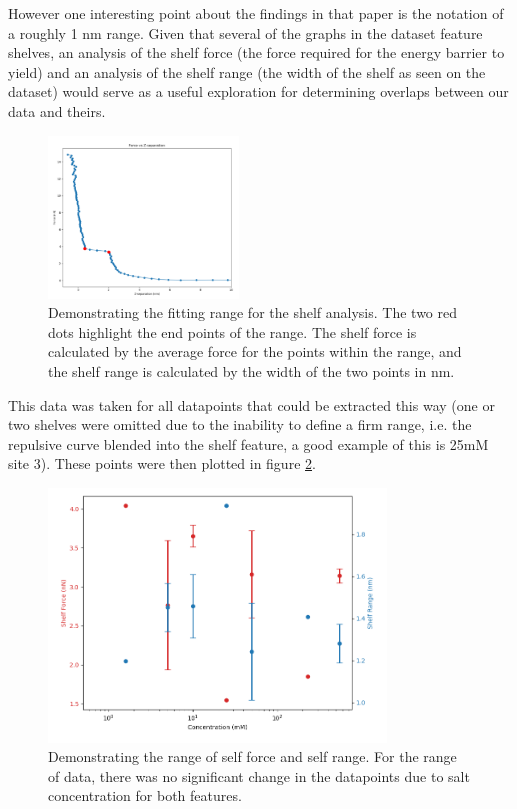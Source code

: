 However one interesting point about the findings in that paper is the notation of a roughly 1 nm range. Given that several of the graphs in the dataset feature shelves, an analysis of the shelf force (the force required for the energy barrier to yield) and an analysis of the shelf range (the width of the shelf as seen on the dataset) would serve as a useful exploration for determining overlaps between our data and theirs.

\begin{figure}[h!]
\centering
\includegraphics[width=0.45\textwidth]{chapter8/Shelf/Force calculatio.png}
\caption{Demonstrating the fitting range for the shelf analysis. The two red dots highlight the end points of the range. The shelf force is calculated by the average force for the points within the range, and the shelf range is calculated by the width of the two points in nm.}
\label{fig:forcecalc}
\end{figure}

This data was taken for all datapoints that could be extracted this way (one or two shelves were omitted due to the inability to define a firm range, i.e. the repulsive curve blended into the shelf feature, a good example of this is 25mM site 3). These points were then plotted in figure \ref{fig:resultsShelf}.

\begin{figure}[h!!]
\centering
\includegraphics[width=0.8\textwidth]{chapter8/Shelf/ShelfScatter2.png}
\caption{Demonstrating the range of self force and self range. For the range of data, there was no significant change in the datapoints due to salt concentration for both features.}
\label{fig:resultsShelf}
\end{figure}

